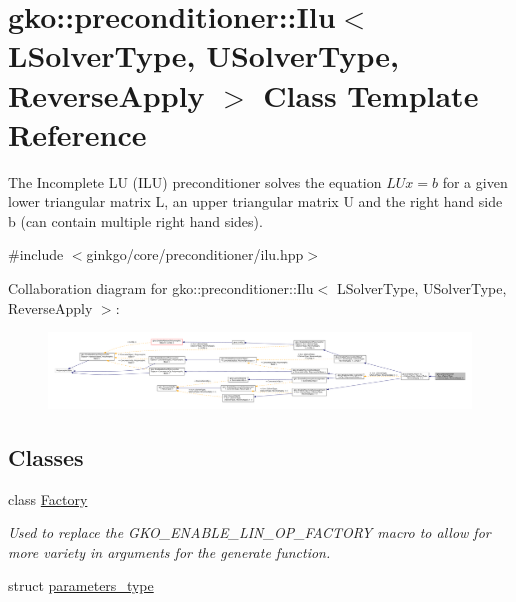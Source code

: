 \hypertarget{classgko_1_1preconditioner_1_1Ilu}{}\section{gko\+:\+:preconditioner\+:\+:Ilu$<$ L\+Solver\+Type, U\+Solver\+Type, Reverse\+Apply $>$ Class Template Reference}
\label{classgko_1_1preconditioner_1_1Ilu}


The Incomplete LU (I\+LU) preconditioner solves the equation $LUx = b$ for a given lower triangular matrix L, an upper triangular matrix U and the right hand side b (can contain multiple right hand sides).  




{\ttfamily \#include $<$ginkgo/core/preconditioner/ilu.\+hpp$>$}



Collaboration diagram for gko\+:\+:preconditioner\+:\+:Ilu$<$ L\+Solver\+Type, U\+Solver\+Type, Reverse\+Apply $>$\+:
\nopagebreak
\begin{figure}[H]
\begin{center}
\leavevmode
\includegraphics[width=350pt]{classgko_1_1preconditioner_1_1Ilu__coll__graph}
\end{center}
\end{figure}
\subsection*{Classes}
\begin{DoxyCompactItemize}
\item 
class \hyperlink{classgko_1_1preconditioner_1_1Ilu_1_1Factory}{Factory}
\begin{DoxyCompactList}\small\item\em Used to replace the {\ttfamily G\+K\+O\+\_\+\+E\+N\+A\+B\+L\+E\+\_\+\+L\+I\+N\+\_\+\+O\+P\+\_\+\+F\+A\+C\+T\+O\+RY} macro to allow for more variety in arguments for the {\ttfamily generate} function. \end{DoxyCompactList}\item 
struct \hyperlink{structgko_1_1preconditioner_1_1Ilu_1_1parameters__type}{parameters\+\_\+type}
\end{DoxyCompactItemize}
